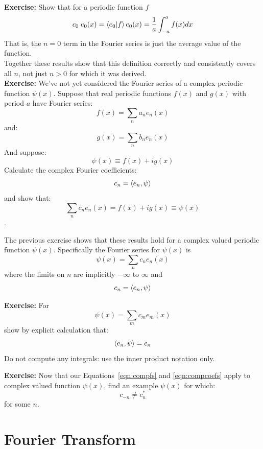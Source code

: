 \documentclass[12pt]{book}
\begin{document}
\noindent
{\bf Exercise:} Show that for a periodic function $f$ 
$$c_0 \; e_0(x) = \braket{e_0|f} e_0(x) = \frac{1}{a}\int_{-a}^{a} f(x) dx$$
\noindent
That is, the $n=0$ term in the Fourier series is just the average value of the function.\\

Together these results show that this definition correctly and consistently covers all $n$, not just $n>0$ for which it was derived.\\

\noindent
{\bf Exercise:}  We've not yet considered the Fourier series of a complex periodic function $\psi(x)$.  
Suppose that real periodic functions $f(x)$ and $g(x)$ with period $a$ have Fourier series:
$$f(x) = \sum_n a_n e_n(x)$$
and:
$$g(x) = \sum_n b_n e_n(x)$$
And suppose:
$$\psi(x) \equiv f(x) + i g(x)$$
Calculate the complex Fourier coefficients:
$$c_n = \braket{e_n, \psi}$$
and show that:
$$\sum_n c_n e_n(x) = f(x) + i g(x) \equiv \psi(x)$$.

The previous exercise shows that these results hold for a complex valued periodic function $\psi(x)$.  Specifically the 
Fourier series for $\psi(x)$ is
\begin{equation}
\label{eqn:compfs}
\psi(x) = \sum_n c_n e_n(x)
\end{equation}
where the limits on $n$ are implicitly $-\infty$ to $\infty$ and
\begin{equation}
\label{eqn:compcoefs}
c_n = \braket{e_n, \psi}
\end{equation}

\noindent
{\bf Exercise:} For 
$$\psi(x) = \sum_m c_m e_m(x)$$
show by explicit calculation that:
$$\braket{e_n, \psi} = c_n$$
Do not compute any integrals: use the inner product notation only.

\noindent
{\bf Exercise:} Now that our Equations~\ref{eqn:compfs} and \ref{eqn:compcoefs} apply to complex valued function $\psi(x)$, find an example $\psi(x)$ for which:
 $$c_{-n} \neq c_{n}^*$$
for some $n$. 

\section{Fourier Transform}
\end{document}
